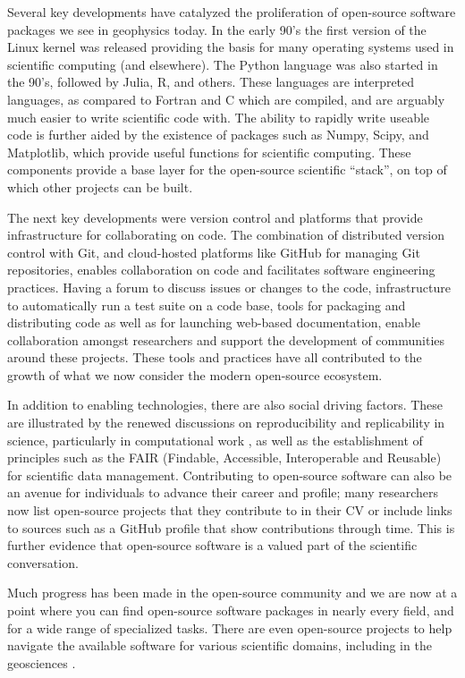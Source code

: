 

Several key developments have catalyzed the proliferation of open-source software packages we see in geophysics today. In the early 90's the first version of the Linux kernel was released providing the basis for many operating systems used in scientific computing (and elsewhere). The Python language was also started in the 90's, followed by Julia, R, and others. These languages are interpreted languages, as compared to Fortran and C which are compiled, and are arguably much easier to write scientific code with. The ability to rapidly write useable code is further aided by the existence of packages such as Numpy, Scipy, and Matplotlib, which provide useful functions for scientific computing. These components provide a base layer for the open-source scientific ``stack'', on top of which other projects can be built.

The next key developments were version control and platforms that provide infrastructure for collaborating on code. The combination of distributed version control with Git, and cloud-hosted platforms like GitHub for managing Git repositories, enables collaboration on code and facilitates software engineering practices. Having a forum to discuss issues or changes to the code, infrastructure to automatically run a test suite on a code base, tools for packaging and distributing code as well as for launching web-based documentation, enable collaboration amongst researchers and support the development of communities around these projects. These tools and practices have all contributed to the growth of what we now consider the modern open-source ecosystem.

In addition to enabling technologies, there are also social driving factors. These are illustrated by the renewed discussions on reproducibility and replicability in science, particularly in computational work \citep{national_academies_of_sciences_reproducibility_2019}, as well as the establishment of principles such as the FAIR (Findable, Accessible, Interoperable and Reusable) for scientific data management. Contributing to open-source software can also be an avenue for individuals to advance their career and profile; many researchers now list open-source projects that they contribute to in their CV or include links to sources such as a GitHub profile that show contributions through time. This is further evidence that open-source software is a valued part of the scientific conversation.

Much progress has been made in the open-source community and we are now at a point where you can find open-source software packages in nearly every field, and for a wide range of specialized tasks. There are even open-source projects to help navigate the available software for various scientific domains, including in the geosciences \cite{awesome-open-geoscience}.


